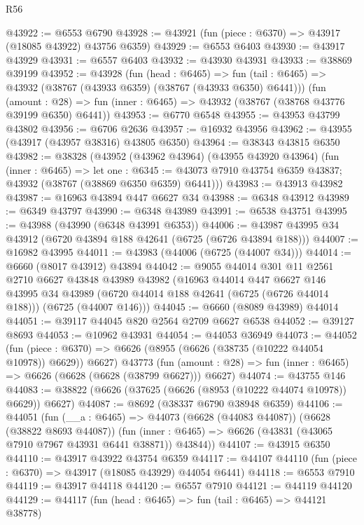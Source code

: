 \begin{lexlean}{R56}
\begin{coremodule}
@43922 := @6553 @6790
@43928 := @43921 (fun (piece : @6370) => @43917 (@18085 @43922) @43756 @6359)
@43929 := @6553 @6403
@43930 := @43917 @43929
@43931 := @6557 @6403
@43932 := @43930 @43931
@43933 := @38869 @39199
@43952 := @43928
    (fun (head : @6465) =>
    fun (tail : @6465) => @43932 (@38767 (@43933 @6359) (@38767 (@43933 @6350) @6441)))
    (fun (amount : @28) =>
    fun (inner : @6465) => @43932 (@38767 (@38768 @43776 @39199 @6350) @6441))
@43953 := @6770 @6548
@43955 := @43953 @43799 @43802
@43956 := @6706 @2636
@43957 := @16932 @43956
@43962 := @43955 (@43917 (@43957 @38316) @43805 @6350)
@43964 := @38343 @43815 @6350
@43982 := @38328
    (@43952
      (@43962 @43964)
      (@43955 @43920 @43964)
      (fun (inner : @6465) =>
      let one : @6345 := @43073 @7910 @43754 @6359 @43837;
      @43932 (@38767 (@38869 @6350 @6359) @6441)))
@43983 := @43913 @43982
@43987 := @16963 @43894 @447 @6627 @34
@43988 := @6348 @43912
@43989 := @6349 @43797
@43990 := @6348 @43989
@43991 := @6538 @43751
@43995 := @43988 (@43990 (@6348 @43991 @6353))
@44006 := @43987 @43995 @34 @43912 (@6720 @43894 @188 @42641 (@6725 (@6726 @43894 @188)))
@44007 := @16982 @43995
@44011 := @43983 (@44006 (@6725 (@44007 @34)))
@44014 := @6660 (@8017 @43912) @43894
@44042 := @9055
    @44014
    @301
    @11
    @2561
    @2710
    @6627
    @43848
    @43989
    @43982
    (@16963
      @44014
      @447
      @6627
      @146
      @43995
      @34
      @43989
      (@6720 @44014 @188 @42641 (@6725 (@6726 @44014 @188)))
      (@6725 (@44007 @146)))
@44045 := @6660 (@8089 @43989) @44014
@44051 := @39117 @44045 @820 @2564 @2709 @6627 @6538
@44052 := @39127 @8693
@44053 := @10962 @43931
@44054 := @44053 @36949
@44073 := @44052
    (fun (piece : @6370) => @6626 (@8955 (@6626 (@38735 (@10222 @44054 @10978)) @6629)) @6627)
    @43773
    (fun (amount : @28) => fun (inner : @6465) => @6626 (@6628 (@6628 (@38799 @6627))) @6627)
@44074 := @43755 @146
@44083 := @38822 (@6626 (@37625 (@6626 (@8953 (@10222 @44074 @10978)) @6629)) @6627)
@44087 := @8692 (@38337 @6790 @38948 @6359)
@44106 := @44051
    (fun (__a : @6465) =>
    @44073
      (@6628 (@44083 @44087))
      (@6628 (@38822 @8693 @44087))
      (fun (inner : @6465) => @6626 (@43831 (@43065 @7910 @7967 @43931 @6441 @38871)) @43844))
@44107 := @43915 @6350
@44110 := @43917 @43922 @43754 @6359
@44117 := @44107 @44110 (fun (piece : @6370) => @43917 (@18085 @43929) @44054 @6441)
@44118 := @6553 @7910
@44119 := @43917 @44118
@44120 := @6557 @7910
@44121 := @44119 @44120
@44129 := @44117
    (fun (head : @6465) => fun (tail : @6465) => @44121 @38778)

\end{coremodule}
\end{lexlean}
